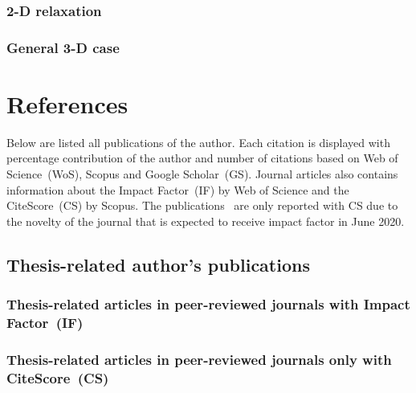 \documentclass[a4paper,11pt,titlepage,twoside]{book}
\begin{document}
\subsection{2-D relaxation}

\subsection{General 3-D case}




\appendix
\renewcommand\chaptername{Appendix}

\chapter{References}

Below are listed all publications of the author.
Each citation is displayed with percentage contribution of the author and number of citations based on Web of Science~(WoS), Scopus and Google Scholar~(GS).
Journal articles also contains information about the Impact Factor~(IF) by Web of Science and the CiteScore~(CS) by Scopus.
The publications~\cite{loianno2018localization, petrlik2020robust, stibinger2020localization} are only reported with CS due to the novelty of the journal that is expected to receive impact factor in June 2020.

\section{Thesis-related author's publications}

\subsection*{Thesis-related articles in peer-reviewed journals with Impact Factor~(IF)}
\printbibliography[keyword={mine},keyword={phd_related},keyword={journal},keyword={if},heading=none,title={}]

\subsection*{Thesis-related articles in peer-reviewed journals only with CiteScore~(CS)}
\printbibliography[keyword={mine},keyword={phd_related},keyword={journal},keyword={cs},heading=none,title={}]
\end{document}
